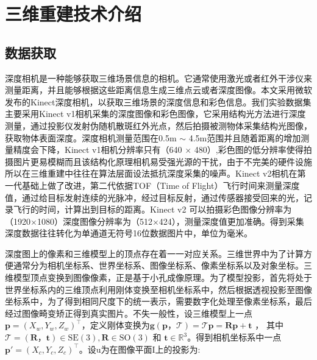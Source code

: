 \chapter{三维重建技术介绍}

%
%
\section{数据获取}

深度相机是一种能够获取三维场景信息的相机。它通常使用激光或者红外干涉仪来测量距离，并且能够根据这些距离信息生成三维点云或者深度图像。本文采用微软发布的Kinect深度相机，以获取三维场景的深度信息和彩色信息。我们实验数据集主要采用Kinect v1相机采集的深度图像和彩色图像，它采用结构光方法进行深度测量，通过投影仪发射伪随机散斑红外光点，然后拍摄被测物体采集结构光图像，获取物体表面深度。深度相机测量范围在0.5m $\sim$ 4.5m范围并且随着距离的增加测量精度会下降，Kinect v1相机分辨率只有（640 $\times$ 480）,彩色图的低分辨率使得拍摄图片更易模糊而且该结构化原理相机易受强光源的干扰，由于不完美的硬件设施所以在三维重建中往往在算法层面设法抵抗深度采集的噪声。Kinect v2相机在第一代基础上做了改进，第二代依据TOF（Time of Flight）飞行时间来测量深度值，通过给目标发射连续的光脉冲，经过目标反射，通过传感器接受回来的光，记录飞行的时间，计算出到目标的距离。Kinect v2 可以拍摄彩色图像分辨率为（1920$\times$1080）深度图像分辨率为（512$\times$424），测量深度值更加准确。得到采集深度数据往往转化为单通道无符号16位数据图片中，单位为毫米。\par 
深度图上的像素和三维模型上的顶点存在着一一对应关系。三维世界中为了计算方便通常分为相机坐标系、世界坐标系、图像坐标系、像素坐标系以及对象坐标。三维模型顶点变换到图像像素，正是基于小孔成像原理。为了模型投影，首先将处于世界坐标系内的三维顶点利用刚体变换至相机坐标系中，然后根据透视投影至图像坐标系中，为了得到相同尺度下的统一表示，需要数字化处理至像素坐标系，最后经过图像畸变矫正得到真实图片。不失一般性，设三维模型上一点$\boldsymbol{p} = (X_w,Y_w,Z_w)^\top $，定义刚体变换为$\mathbf{g}\left(\boldsymbol{p}， \mathcal{T}\right)=\mathcal{T} \boldsymbol{p} = \boldsymbol{R} \boldsymbol{p}+\boldsymbol{t}$ ，
其中$\mathcal{T}=\left(\boldsymbol{R}，\boldsymbol{t}\right) \in \mathrm{SE} (3), \boldsymbol{R}   \in \mathrm{SO}(3) \text { 和 } \boldsymbol{t} \in \mathbb{R}^{3}$。得到相机坐标系中一点$\boldsymbol{p'}=(X_c,Y_c,Z_c)^\top$。设$\mathrm{u}$为在图像平面$\mathrm{I}$上的投影为:
